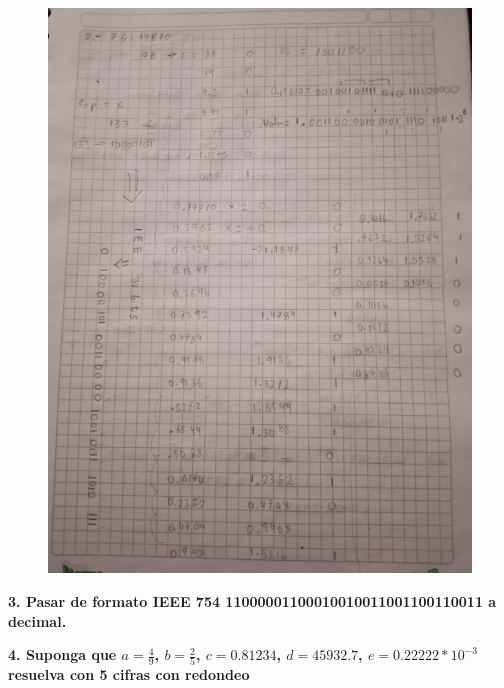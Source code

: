 \documentclass[12pt]{article}
\begin{document}
\begin{figure}[H]
\centering
\includegraphics[width=1\textwidth]{./inFiles/Figures/10.jpeg}
\end{figure}

\textbf{3. Pasar de formato IEEE 754 11000001100010010011001100110011 a decimal.} 

\textbf{4. Suponga que $a = \frac{4}{9}$,  $b = \frac{2}{5}$, $c = 0.81234$, $d = 45932.7$, $e = 0.22222*10^{-3}$ resuelva con 5 cifras con redondeo}
\end{document}
